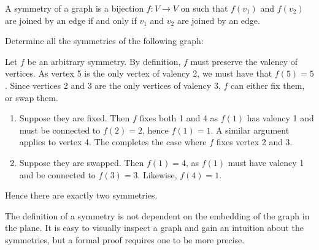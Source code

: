 \documentclass[12pt]{report}
\newenvironment{note}{\begin{bluebox}}{\end{bluebox}}
\begin{document}
\begin{definition}\cite[Definition 1.1.3]{wemyss2015grouptheory}
  A symmetry of a graph is a bijection \(f : V \to V\) on such that \(f(v_{1})\) and \(f(v_{2})\) are joined by an edge if and only if \(v_{1}\) and \(v_{2}\) are joined by an edge.
\end{definition}

\begin{example}
  Determine all the symmetries of the following graph:

  \begin{centre}
  \end{centre}

  Let \(f\) be an arbitrary symmetry.
  By definition, \(f\) must preserve the valency of vertices.
  As vertex 5 is the only vertex of valency 2, we must have that \(f(5) = 5\).
  Since vertices 2 and 3 are the only vertices of valency 3, \(f\) can either fix them, or swap them.
  \begin{enumerate}
  \item
    Suppose they are fixed.
    Then \(f\) fixes both 1 and 4 as \(f(1)\) has valency 1 and must be connected to \(f(2) = 2\), hence \(f(1) = 1\).
    A similar argument applies to vertex 4.
    The completes the case where \(f\) fixes vertex 2 and 3.
  \item
    Suppose they are swapped.
    Then \(f(1) = 4\), as \(f(1)\) must have valency 1 and be connected to \(f(3) = 3\).
    Likewise, \(f(4) = 1\).
  \end{enumerate}

  Hence there are exactly two symmetries.
\end{example}

\begin{note}
  The definition of a symmetry is not dependent on the embedding of the graph in the plane.
  It is easy to visually inspect a graph and gain an intuition about the symmetries, but a formal proof requires one to be more precise.
\end{note}
\end{document}
